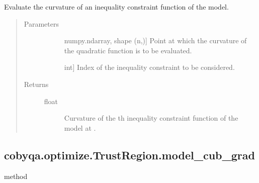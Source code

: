 \documentclass[letterpaper,10pt,english]{sphinxmanual}
\begin{document}
\begin{fulllineitems}
\begin{fulllineitems}
\label{\detokenize{refs/generated/cobyqa.optimize.TrustRegion.model_cub_curv:cobyqa.optimize.TrustRegion.model_cub_curv}}
\sphinxAtStartPar
Evaluate the curvature of an inequality constraint function of the
model.
\begin{quote}\begin{description}
\item[{Parameters}] \leavevmode\begin{description}
\item[{}] \leavevmode{[}numpy.ndarray, shape (n,){]}
\sphinxAtStartPar
Point at which the curvature of the quadratic function is to be
evaluated.

\item[{}] \leavevmode{[}int{]}
\sphinxAtStartPar
Index of the inequality constraint to be considered.

\end{description}

\item[{Returns}] \leavevmode\begin{description}
\item[{float}] \leavevmode
\sphinxAtStartPar
Curvature of the \sphinxhyphen{}th inequality constraint function of the model
at .

\end{description}

\end{description}\end{quote}

\end{fulllineitems}



\subsection{cobyqa.optimize.TrustRegion.model\_cub\_grad}
\label{\detokenize{refs/generated/cobyqa.optimize.TrustRegion.model_cub_grad:cobyqa-optimize-trustregion-model-cub-grad}}\label{\detokenize{refs/generated/cobyqa.optimize.TrustRegion.model_cub_grad::doc}}
\sphinxAtStartPar
method


\end{fulllineitems}
\end{document}
